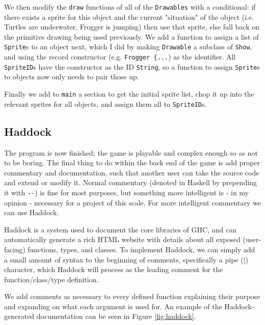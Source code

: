 \documentclass[12pt, a4paper]{report}
\begin{document}
\par

We then modify the \verb|draw| functions of all of the \verb|Drawables| with a conditional: if there exists a sprite for this object and the current "situation" of the object (i.e. Turtles are underwater, Frogger is jumping) then use that sprite, else fall back on the primitive drawing being used previously.
We add a function to assign a list of \verb|Sprite|s to an object next, which I did by making \verb|Drawable| a subclass of \verb|Show|, and using the record constructor (e.g. \verb|Frogger {...|) as the identifier.
All \verb|SpriteID|s have the constructor as the ID \verb|String|, so a function to assign \verb|Sprite|s to objects now only needs to pair those up.

\par

Finally we add to \verb|main| a section to get the initial sprite list, chop it up into the relevant sprites for all objects, and assign them all to \verb|SpriteID|s.

\subsection{Haddock}

The program is now finished; the game is playable and complex enough so as not to be boring.
The final thing to do within the back end of the game is add proper commentary and documentation, such that another user can take the source code and extend or modify it.
Normal commentary (denoted in Haskell by prepending it with \verb|--|) is fine for most purposes, but something more intelligent is - in my opinion - necessary for a project of this scale.
For more intelligent commentary we can use Haddock.

\par

Haddock is a system used to document the core libraries of GHC\cite{haddocksite}, and can automatically generate a rich HTML website with details about all exposed (user-facing) functions, types, and classes.
To implement Haddock, we can simply add a small amount of syntax to the beginning of comments, specifically a pipe ($\vert$) character, which Haddock will process as the leading comment for the function/class/type definition.

\par

We add comments as necessary to every defined function explaining their purpose and expanding on what each argument is used for.
An example of the Haddock-generated documentation can be seen in Figure \ref{fig:haddock}.
\end{document}
